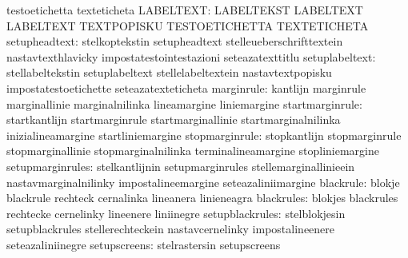                                   testoetichetta                   texteticheta
                       LABELTEXT: LABELTEKST                       LABELTEXT
                                  LABELTEXT                        TEXTPOPISKU
                                  TESTOETICHETTA                   TEXTETICHETA
                   setupheadtext: stelkoptekstin                   setupheadtext
                                  stelleueberschrifttextein        nastavtexthlavicky
                                  impostatestointestazioni         seteazatexttitlu
                  setuplabeltext: stellabeltekstin                 setuplabeltext
                                  stellelabeltextein               nastavtextpopisku
                                  impostatestoetichette            seteazatexteticheta
                      marginrule: kantlijn                         marginrule
                                  marginallinie                    marginalnilinka
                                  lineamargine                     liniemargine
                 startmarginrule: startkantlijn                    startmarginrule
                                  startmarginallinie               startmarginalnilinka
                                  inizialineamargine               startliniemargine
                  stopmarginrule: stopkantlijn                     stopmarginrule
                                  stopmarginallinie                stopmarginalnilinka
                                  terminalineamargine              stopliniemargine
                setupmarginrules: stelkantlijnin                   setupmarginrules
                                  stellemarginallinieein           nastavmarginalnilinky
                                  impostalineemargine              seteazaliniimargine
                       blackrule: blokje                           blackrule
                                  rechteck                         cernalinka
                                  lineanera                        linieneagra
                      blackrules: blokjes                          blackrules
                                  rechtecke                        cernelinky
                                  lineenere                        liniinegre
                 setupblackrules: stelblokjesin                    setupblackrules
                                  stellerechteckein                nastavcernelinky
                                  impostalineenere                 seteazaliniinegre
                    setupscreens: stelrastersin                    setupscreens
